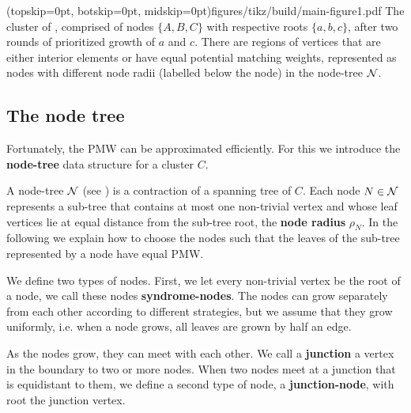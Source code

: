 \Figure[bt](topskip=0pt, botskip=0pt, midskip=0pt){figures/tikz/build/main-figure1.pdf}{
    The cluster of , comprised of nodes $\{A, B, C\}$ with respective roots $\{a, b, c\}$, after two rounds of prioritized growth of $a$ and $c$. There are regions of vertices that are either interior elements or have equal potential matching weights, represented as nodes with different node radii (labelled below the node) in the node-tree $\mathcal{N}$. \label{fig:pmw}}

\subsection{The node tree}\label{sec:nodeset}
Fortunately, the PMW can be approximated efficiently. 
For this we introduce the \textbf{node-tree} data structure for a cluster $C$. 

A node-tree $\mathcal{N}$ (see ) is a contraction of a spanning tree of $C$. Each node $N\in\mathcal{N}$ represents a sub-tree that contains at most one non-trivial vertex and whose leaf vertices lie at equal distance from the sub-tree root, the \textbf{node radius} $\rho_N$. In the following we explain how to choose the nodes such that the leaves of the sub-tree represented by a node have equal PMW.

We define two types of nodes. First, we let every non-trivial vertex be the root of a node, we call these nodes \textbf{syndrome-nodes}. The nodes can grow separately from each other according to different strategies, but we assume that they grow uniformly, i.e. when a node grows, all leaves are grown by half an edge.

As the nodes grow, they can meet with each other. We call a \textbf{junction} a vertex in the boundary to two or more nodes. When two nodes meet at a junction that is equidistant to them, we define a second type of node, a \textbf{junction-node}, with root the junction vertex. 


